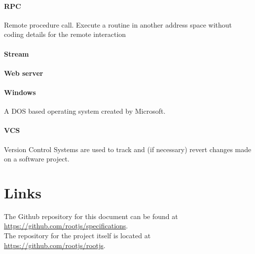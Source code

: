 \paragraph{RPC}
Remote procedure call. Execute a routine in another address space without coding details for the remote interaction
\paragraph{Stream}

\paragraph{Web server}

\paragraph{Windows}
A DOS based operating system created by Microsoft.

\paragraph{VCS}
Version Control Systems are used to track and (if necessary) revert changes made on a software project.
\pagebreak[4]

\section{Links}
The Github repository for this document can be found at \url{https://github.com/rootjs/specifications}. \\
The repository for the project itself is located at \url{https://github.com/rootjs/rootjs}.
